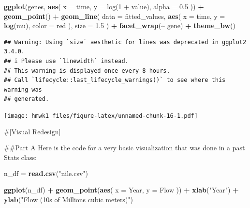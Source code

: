 \documentclass[
]{article}
\newenvironment{Shaded}{\begin{snugshade}}{\end{snugshade}}
\newcommand{\AttributeTok}[1]{\textcolor[rgb]{0.13,0.29,0.53}{#1}}
\newcommand{\FloatTok}[1]{\textcolor[rgb]{0.00,0.00,0.81}{#1}}
\newcommand{\FunctionTok}[1]{\textcolor[rgb]{0.13,0.29,0.53}{\textbf{#1}}}
\newcommand{\NormalTok}[1]{#1}
\newcommand{\OtherTok}[1]{\textcolor[rgb]{0.56,0.35,0.01}{#1}}
\newcommand{\SpecialCharTok}[1]{\textcolor[rgb]{0.81,0.36,0.00}{\textbf{#1}}}
\newcommand{\StringTok}[1]{\textcolor[rgb]{0.31,0.60,0.02}{#1}}
\begin{document}
\begin{Shaded}
\begin{Highlighting}[]
\FunctionTok{ggplot}\NormalTok{(genes, }\FunctionTok{aes}\NormalTok{(}
  \AttributeTok{x =}\NormalTok{ time,}
  \AttributeTok{y =} \StringTok{\textasciigrave{}}\AttributeTok{log(1 + value)}\StringTok{\textasciigrave{}}\NormalTok{,}
  \AttributeTok{alpha =} \FloatTok{0.5}
\NormalTok{)) }\SpecialCharTok{+}
  \FunctionTok{geom\_point}\NormalTok{() }\SpecialCharTok{+}
  \FunctionTok{geom\_line}\NormalTok{(}
    \AttributeTok{data =}\NormalTok{ fitted\_values,}
    \FunctionTok{aes}\NormalTok{(}
      \AttributeTok{x =}\NormalTok{ time,}
      \AttributeTok{y =} \FunctionTok{log}\NormalTok{(mu),}
      \AttributeTok{color =} \StringTok{\textquotesingle{}red\textquotesingle{}}
\NormalTok{    ),}
    \AttributeTok{size =} \FloatTok{1.5}
\NormalTok{  ) }\SpecialCharTok{+}
  \FunctionTok{facet\_wrap}\NormalTok{(}\SpecialCharTok{\textasciitilde{}}\NormalTok{ gene) }\SpecialCharTok{+}
  \FunctionTok{theme\_bw}\NormalTok{()}
\end{Highlighting}
\end{Shaded}

\begin{verbatim}
## Warning: Using `size` aesthetic for lines was deprecated in ggplot2 3.4.0.
## i Please use `linewidth` instead.
## This warning is displayed once every 8 hours.
## Call `lifecycle::last_lifecycle_warnings()` to see where this warning was
## generated.
\end{verbatim}

\texttt{[image: hmwk1\_files/figure-latex/unnamed-chunk-16-1.pdf]}

\#{[}Visual Redesign{]}

\#\#Part A Here is the code for a very basic visualization that was done
in a past Stats class:

\begin{Shaded}
\begin{Highlighting}[]
\NormalTok{n\_df }\OtherTok{=} \FunctionTok{read.csv}\NormalTok{(}\StringTok{"nile.csv"}\NormalTok{)}

\FunctionTok{ggplot}\NormalTok{(n\_df) }\SpecialCharTok{+}
  \FunctionTok{geom\_point}\NormalTok{(}\FunctionTok{aes}\NormalTok{(}
    \AttributeTok{x =}\NormalTok{ Year,}
    \AttributeTok{y =}\NormalTok{ Flow}
\NormalTok{  )) }\SpecialCharTok{+}
  \FunctionTok{xlab}\NormalTok{(}\StringTok{"Year"}\NormalTok{) }\SpecialCharTok{+}
  \FunctionTok{ylab}\NormalTok{(}\StringTok{"Flow (10\textquotesingle{}s of Millions cubic meters)"}\NormalTok{)}
\end{Highlighting}
\end{Shaded}
\end{document}
